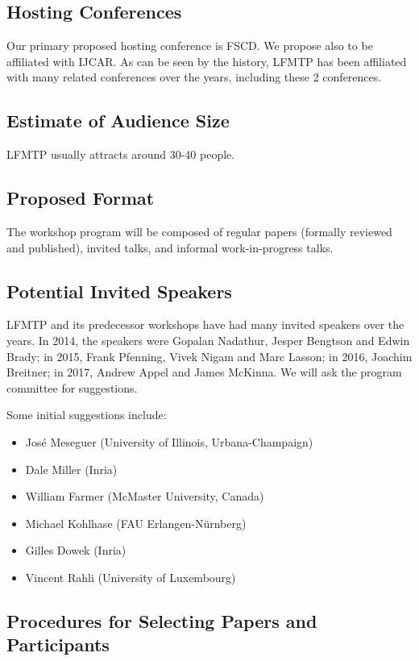 \documentclass{article}
\begin{document}
\subsection{Hosting Conferences}

   Our primary proposed hosting conference is FSCD. We propose
   also to be affiliated with IJCAR. As can be seen by the history,
   LFMTP has been affiliated with many related conferences over the
   years, including these 2 conferences.

\subsection{Estimate of Audience Size}

   LFMTP usually attracts around 30-40 people.

\subsection{Proposed Format}

   The workshop program will be composed of regular papers (formally
   reviewed and published), invited talks, and informal
   work-in-progress talks.

\subsection{Potential Invited Speakers}

   LFMTP and its predecessor workshops have had many invited speakers
   over the years. In 2014, the speakers were Gopalan Nadathur, Jesper
   Bengtson and Edwin Brady; in 2015, Frank Pfenning, Vivek Nigam and
   Marc Lasson; in 2016, Joachim Breitner; in 2017, Andrew Appel and
   James McKinna. We will ask the program committee for suggestions.

   Some initial suggestions include:
\begin{itemize}
\item José Meseguer (University of Illinois, Urbana-Champaign)
\item Dale Miller (Inria)
\item William Farmer (McMaster University, Canada)
\item Michael Kohlhase (FAU Erlangen-Nürnberg)
\item Gilles Dowek (Inria)
\item Vincent Rahli (University of Luxembourg)
\end{itemize}

\subsection{Procedures for Selecting Papers and Participants}
\end{document}
